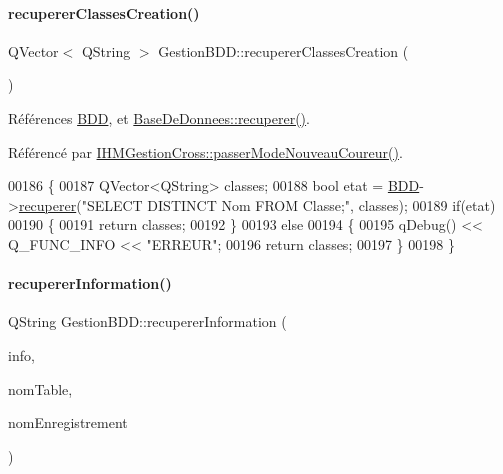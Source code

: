 \paragraph{\texorpdfstring{recuperer\+Classes\+Creation()}{recupererClassesCreation()}}
{\footnotesize\ttfamily Q\+Vector$<$ Q\+String $>$ Gestion\+B\+D\+D\+::recuperer\+Classes\+Creation (\begin{DoxyParamCaption}{ }\end{DoxyParamCaption})}



Références \hyperlink{class_gestion_b_d_d_a1bd17cbf5754eb6e54ae351f1d02dca2}{B\+DD}, et \hyperlink{class_base_de_donnees_a77539baad389f5acf754cd2cd452403e}{Base\+De\+Donnees\+::recuperer()}.



Référencé par \hyperlink{class_i_h_m_gestion_cross_ac8f336c95a5f0c9eb8a4bc1c4bb83445}{I\+H\+M\+Gestion\+Cross\+::passer\+Mode\+Nouveau\+Coureur()}.


\begin{DoxyCode}
00186 \{
00187     QVector<QString> classes;
00188     \textcolor{keywordtype}{bool} etat = \hyperlink{class_gestion_b_d_d_a1bd17cbf5754eb6e54ae351f1d02dca2}{BDD}->\hyperlink{class_base_de_donnees_a77539baad389f5acf754cd2cd452403e}{recuperer}(\textcolor{stringliteral}{"SELECT DISTINCT Nom FROM Classe;"}, classes);
00189     \textcolor{keywordflow}{if}(etat)
00190     \{
00191         \textcolor{keywordflow}{return} classes;
00192     \}
00193     \textcolor{keywordflow}{else}
00194     \{
00195         qDebug() << Q\_FUNC\_INFO << \textcolor{stringliteral}{"ERREUR"};
00196         \textcolor{keywordflow}{return} classes;
00197     \}
00198 \}
\end{DoxyCode}
\mbox{\label{class_gestion_b_d_d_a0a2fa02b90974684658937fbfb55bf0a}} 
\paragraph{\texorpdfstring{recuperer\+Information()}{recupererInformation()}}
{\footnotesize\ttfamily Q\+String Gestion\+B\+D\+D\+::recuperer\+Information (\begin{DoxyParamCaption}\item[{Q\+String}]{info,  }\item[{Q\+String}]{nom\+Table,  }\item[{Q\+String}]{nom\+Enregistrement }\end{DoxyParamCaption})}



